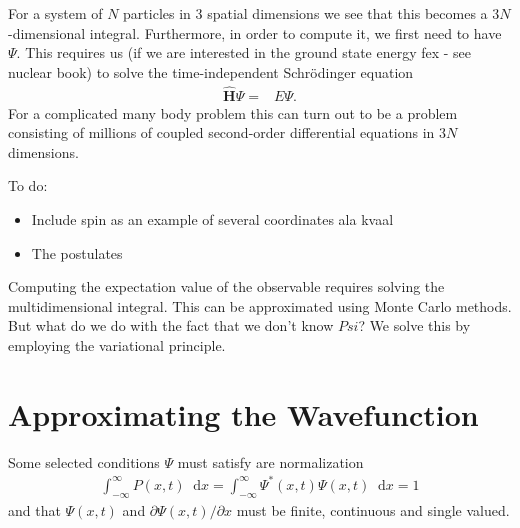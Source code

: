 \documentclass[twoside,english]{uiofysmaster}
\newcommand*\dif{\mathop{}\!\mathrm{d}}
\begin{document}
For a system of $N$ particles in 3 spatial dimensions we see that this becomes a $3N$-dimensional integral. Furthermore, in order to compute it, we first need to have $\Psi$. This requires us (if we are interested in the ground state energy fex - see nuclear book) to solve the time-independent Schrödinger equation
\begin{align}
	\hat{\bm{H}} \Psi =& E\Psi .
\end{align}
For a complicated many body problem this can turn out to be a problem consisting of millions of coupled second-order differential equations in $3N$ dimensions.

To do:
\begin{itemize}
	\item Include spin as an example of several coordinates ala kvaal
	\item The postulates
\end{itemize}


Computing the expectation value of the observable requires solving the multidimensional integral. This can be approximated using Monte Carlo methods. But what do we do with the fact that we don't know $Psi$? We solve this by employing the variational principle.

\section{Approximating the Wavefunction}
Some selected conditions $\Psi$ must satisfy \cite{HjortJensen2015} are normalization 
\begin{align}
	\int_{-\infty}^{\infty} P(x,t) \dif x = \int_{-\infty}^{\infty} \Psi^{\ast}(x,t) \Psi (x,t) \dif x = 1
\end{align}
and that $\Psi (x,t)$ and $\partial \Psi(x,t) / \partial x$ must be finite, continuous and single valued.
\end{document}
